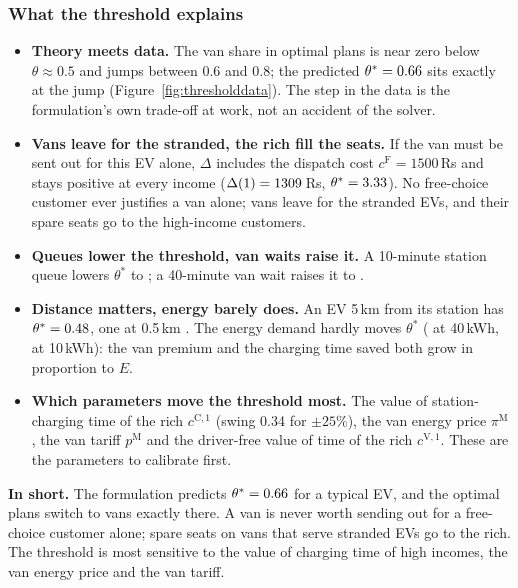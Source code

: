 \documentclass[11pt,a4paper]{article}
\newcommand{\inshort}[1]{\begin{insum}\textbf{In short.} #1\end{insum}}
\begin{document}
\subsubsection{What the threshold explains}
\begin{itemize}
  \item \textbf{Theory meets data.} The van share in optimal plans is near zero below $\theta\approx0.5$ and jumps between 0.6 and 0.8; the predicted $\theta^{*}=0.66$ sits exactly at the jump (Figure~\ref{fig:thresholddata}). The step in the data is the formulation's own trade-off at work, not an accident of the solver.
  \item \textbf{Vans leave for the stranded, the rich fill the seats.} If the van must be sent out for this EV alone, $\Delta$ includes the dispatch cost $c^{\mathrm F}=1500$\,Rs and stays positive at every income ($\Delta(1)=1309$\,Rs, $\theta^{*}=3.33$). No free-choice customer ever justifies a van alone; vans leave for the stranded EVs, and their spare seats go to the high-income customers.
  \item \textbf{Queues lower the threshold, van waits raise it.} A 10-minute station queue lowers $\theta^{*}$ to \ThetaStarQueue; a 40-minute van wait raises it to \ThetaStarWait.
  \item \textbf{Distance matters, energy barely does.} An EV 5\,km from its station has $\theta^{*}=0.48$, one at 0.5\,km \ThetaStarNear. The energy demand hardly moves $\theta^{*}$ (\ThetaStarBigE{} at 40\,kWh, \ThetaStarSmallE{} at 10\,kWh): the van premium and the charging time saved both grow in proportion to $E$.
  \item \textbf{Which parameters move the threshold most.} The value of station-charging time of the rich $c^{\mathrm{C},1}$ (swing 0.34 for $\pm25\%$), the van energy price $\pi^{\mathrm M}$, the van tariff $p^{\mathrm M}$ and the driver-free value of time of the rich $c^{\mathrm{V},1}$. These are the parameters to calibrate first.
\end{itemize}

\inshort{The formulation predicts $\theta^{*}=0.66$ for a typical EV, and the optimal plans switch to vans exactly there. A van is never worth sending out for a free-choice customer alone; spare seats on vans that serve stranded EVs go to the rich. The threshold is most sensitive to the value of charging time of high incomes, the van energy price and the van tariff.}

\end{document}
